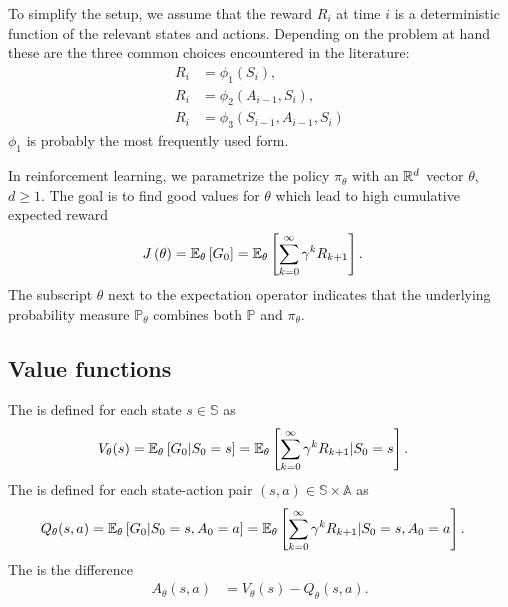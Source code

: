 \documentclass[a4paper,12pt]{amsart}
\newcommand{\stateSpace}{\mathbb S}
\newcommand{\actionSpace}{\mathbb A}
\newcommand{\stateValueFunc}{V}
\newcommand{\actionValueFunc}{Q}
\newcommand{\advantageFunc}{A}
\newcommand{\policy}{\pi}
\newcommand{\discountFactor}{\gamma}
\newcommand{\prob}{\mathbb P}
\newcommand{\rewardFunc}{\phi}
\begin{document}
To simplify the setup, we assume that the reward $R_i$ at time $i$ is a deterministic
function of the relevant states and actions. Depending on the problem at hand
these are the three common choices encountered in the literature:
\begin{align*}
    R_{i} &= \rewardFunc_{1}(S_{i}), \\
    R_{i} &= \rewardFunc_{2}(A_{i-1}, S_{i}), \\
    R_{i} &= \rewardFunc_{3}(S_{i-1}, A_{i-1}, S_{i})
\end{align*}
$\rewardFunc_{1}$ is probably the most frequently used form.

In reinforcement learning, we parametrize the policy $\policy_\theta$ with
an $\mathbb{R}^{d}$ vector $\theta$, $d\geq 1$. The goal is to find good values for $\theta$ 
which lead to high cumulative expected reward
\begin{align*}
    J\left( \theta \right) &= \E_{\theta} \left[ G_0 \right] 
    = \E_{\theta} \left[ \sum_{k=0}^{\infty} \discountFactor^{k} R_{k+1} \right].
\end{align*}
The subscript $\theta$ next to the expectation operator indicates that
the underlying probability measure $\prob_{\theta}$ combines both
$\prob$ and $\policy_{\theta}$.

\subsection{Value functions}

The  is defined for each state $s\in\stateSpace$ as
\begin{align}
    \stateValueFunc_{\theta}(s) &= \E_{\theta} \left[ G_0 | S_{0} = s \right] =
    \E_{\theta}\left[\sum_{k=0}^{\infty} \discountFactor^{k} R_{k+1} | 
        S_{0} = s \right].
    \label{def:state-value-function}
\end{align}
The  is defined for each state-action pair
$(s,a)\in\stateSpace\times\actionSpace$ as
\begin{align}
    \actionValueFunc_{\theta}(s,a) &= \E_{\theta} \left[ G_0 | S_0 = s, A_{0} = a \right] = 
    \E_{\theta}\left[\sum_{k=0}^{\infty} \discountFactor^{k} R_{k+1} | 
        S_0 = s, A_{0} = a \right].
    \label{def:action-value-function}
\end{align}
The  is the difference
\begin{align}
    \advantageFunc_{\theta}(s,a) &= V_{\theta}(s) - Q_{\theta}(s,a).
    \label{def:advantage-function}
\end{align}
\end{document}
